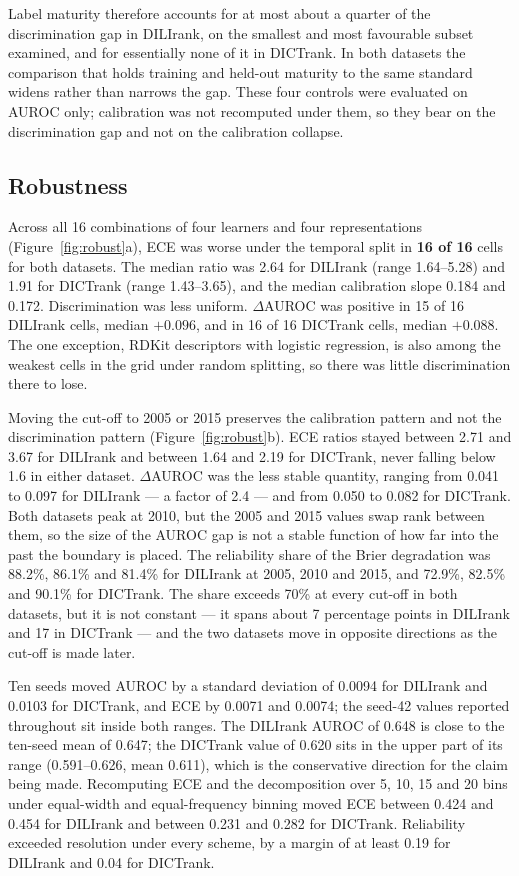 Label maturity therefore accounts for at most about a quarter of the
discrimination gap in DILIrank, on the smallest and most favourable subset
examined, and for essentially none of it in DICTrank. In both datasets the
comparison that holds training and held-out maturity to the same standard widens
rather than narrows the gap. These four controls were evaluated on AUROC only;
calibration was not recomputed under them, so they bear on the discrimination gap
and not on the calibration collapse.

\subsection{Robustness}

Across all 16 combinations of four learners and four representations
(Figure~\ref{fig:robust}a), ECE was worse under the temporal split in
\textbf{16 of 16} cells for both datasets. The median ratio was 2.64 for DILIrank
(range 1.64--5.28) and 1.91 for DICTrank (range 1.43--3.65), and the median
calibration slope 0.184 and 0.172. Discrimination was less uniform. $\Delta$AUROC
was positive in 15 of 16 DILIrank cells, median $+0.096$, and in 16 of 16 DICTrank
cells, median $+0.088$. The one exception, RDKit descriptors with logistic
regression, is also among the weakest cells in the grid under random splitting, so
there was little discrimination there to lose.

Moving the cut-off to 2005 or 2015 preserves the calibration pattern and not the
discrimination pattern (Figure~\ref{fig:robust}b). ECE ratios stayed between 2.71
and 3.67 for DILIrank and between 1.64 and 2.19 for DICTrank, never falling below
1.6 in either dataset. $\Delta$AUROC was the less stable quantity, ranging from
0.041 to 0.097 for DILIrank --- a factor of 2.4 --- and from 0.050 to 0.082 for
DICTrank. Both datasets peak at 2010, but the 2005 and 2015 values swap rank
between them, so the size of the AUROC gap is not a stable function of how far
into the past the boundary is placed. The reliability
share of the Brier degradation was 88.2\%, 86.1\% and 81.4\% for DILIrank at 2005,
2010 and 2015, and 72.9\%, 82.5\% and 90.1\% for DICTrank. The share exceeds 70\%
at every cut-off in both datasets, but it is not constant --- it spans about 7
percentage points in DILIrank and 17 in DICTrank --- and the two datasets move in
opposite directions as the cut-off is made later.

Ten seeds moved AUROC by a standard deviation of 0.0094 for DILIrank and 0.0103
for DICTrank, and ECE by 0.0071 and 0.0074; the seed-42 values reported throughout
sit inside both ranges. The DILIrank AUROC of 0.648 is close to the ten-seed mean
of 0.647; the DICTrank value of 0.620 sits in the upper part of its range
(0.591--0.626, mean 0.611), which is the conservative direction for the claim
being made. Recomputing ECE and the decomposition over 5, 10, 15 and 20 bins under
equal-width and equal-frequency binning moved ECE between 0.424 and 0.454 for
DILIrank and between 0.231 and 0.282 for DICTrank. Reliability exceeded resolution
under every scheme, by a margin of at least 0.19 for DILIrank and 0.04 for
DICTrank.

